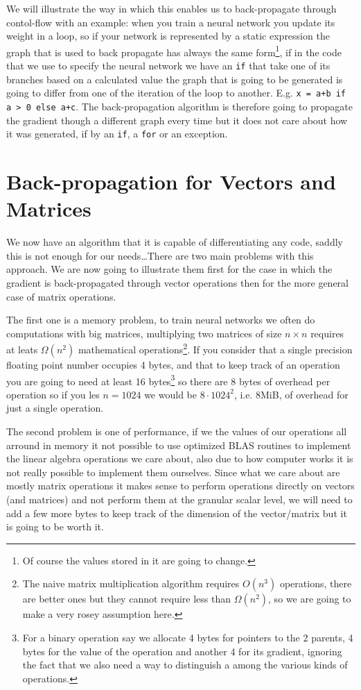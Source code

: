 \documentclass{article}
\begin{document}
We will illustrate the way in which this
enables us to back-propagate through contol-flow with an example: when you train
a neural network you update its weight in a loop, so if your network is
represented by a static expression the graph that is used to back propagate has
always the same form\footnote{Of course the values stored in it are going to
change.}, if in the code that we use to specify the neural network we have an
\texttt{if} that take one of its branches based on a calculated value the graph
that is going to be generated is going to differ from one of the iteration of
the loop to another. E.g. \texttt{x = a+b if a > 0 else a+c}.
The back-propagation algorithm is therefore going to
propagate the gradient though a different graph every time but it does not care
about how it was generated, if by an \texttt{if}, a \texttt{for} or an
exception.

\section{Back-propagation for Vectors and Matrices}

We now have an algorithm that it is capable of differentiating any code, saddly
this is not enough for our needs\dots There are two main problems with this
approach. We are now going to illustrate them first for the case in which the
gradient is back-propagated through vector operations then for the more general
case of matrix operations.

The first one is a memory problem, to train neural networks we often
do computations with big matrices, multiplying two matrices of size \(n \times
n\) requires at leats \(\Omega(n^2)\) mathematical operations\footnote{The
naive matrix multiplication algorithm requires \(O(n^3)\) operations, there are
better ones but they cannot require less than \(\Omega(n^2)\), so we are going
to make a very rosey assumption here.}. If you consider that a single precision
floating point number occupies 4 bytes, and that to keep track of an operation
you are going to need at least 16 bytes\footnote{For a binary operation say we
allocate 4 bytes for pointers to the 2 parents, 4 bytes for the value of the
operation and another 4 for its gradient, ignoring the fact that we also need a
way to distinguish a among the various kinds of operations.} so there are 8
bytes of overhead per
operation so if you les \(n=1024\) we would be \(8 \cdot 1024^2\), i.e. 8MiB,
of overhead for just a single operation.

The second problem is one of performance, if we the values of our operations
all arround in memory it not possible to use optimized BLAS routines to
implement the linear algebra operations we care about, also due to how computer
works it is not really possible to implement them ourselves. Since what we care
about are mostly matrix operations it makes sense to perform operations
directly on vectors (and matrices) and not perform them at the granular scalar
level, we will need to add a few more bytes to keep track of the dimension of
the vector/matrix but it is going to be worth it.
\end{document}
